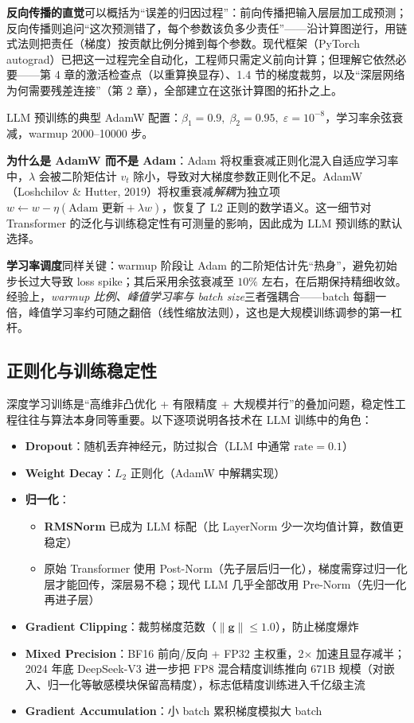 \documentclass[12pt,a4paper]{article}
\begin{document}
\textbf{反向传播的直觉}可以概括为“误差的归因过程”：前向传播把输入层层加工成预测；反向传播则追问“这次预测错了，每个参数该负多少责任”——沿计算图逆行，用链式法则把责任（梯度）按贡献比例分摊到每个参数。现代框架（PyTorch autograd）已把这一过程完全自动化，工程师只需定义前向计算；但理解它依然必要——第 4 章的激活检查点（以重算换显存）、1.4 节的梯度裁剪，以及“深层网络为何需要残差连接”（第 2 章），全部建立在这张计算图的拓扑之上。

LLM 预训练的典型 AdamW 配置：$\beta_1=0.9,\;\beta_2=0.95,\;\varepsilon=10^{-8}$，学习率余弦衰减，warmup 2000--10000 步。

\textbf{为什么是 AdamW 而不是 Adam}：Adam 将权重衰减正则化混入自适应学习率中，$\lambda$ 会被二阶矩估计 $v_t$ 除小，导致对大梯度参数正则化不足。AdamW（Loshchilov \& Hutter, 2019）将权重衰减\emph{解耦}为独立项 $w \leftarrow w - \eta(\text{Adam 更新} + \lambda w)$，恢复了 L2 正则的数学语义。这一细节对 Transformer 的泛化与训练稳定性有可测量的影响，因此成为 LLM 预训练的默认选择。

\textbf{学习率调度}同样关键：warmup 阶段让 Adam 的二阶矩估计先“热身”，避免初始步长过大导致 loss spike；其后采用余弦衰减至 $10\%$ 左右，在后期保持精细收敛。经验上，\emph{warmup 比例、峰值学习率与 batch size}三者强耦合——batch 每翻一倍，峰值学习率约可随之翻倍（线性缩放法则），这也是大规模训练调参的第一杠杆。
\subsection{正则化与训练稳定性}
深度学习训练是“高维非凸优化 + 有限精度 + 大规模并行”的叠加问题，稳定性工程往往与算法本身同等重要。以下逐项说明各技术在 LLM 训练中的角色：
\begin{itemize}
  \item \textbf{Dropout}：随机丢弃神经元，防过拟合（LLM 中通常 $\text{rate}=0.1$）
  \item \textbf{Weight Decay}：$L_2$ 正则化（AdamW 中解耦实现）
  \item \textbf{归一化}：
  \begin{itemize}
    \item \textbf{RMSNorm} 已成为 LLM 标配（比 LayerNorm 少一次均值计算，数值更稳定）
    \item 原始 Transformer 使用 Post-Norm（先子层后归一化），梯度需穿过归一化层才能回传，深层易不稳；现代 LLM 几乎全部改用 Pre-Norm（先归一化再进子层）
  \end{itemize}
  \item \textbf{Gradient Clipping}：裁剪梯度范数（$\|\mathbf{g}\| \leq 1.0$），防止梯度爆炸
  \item \textbf{Mixed Precision}：BF16 前向/反向 + FP32 主权重，2$\times$ 加速且显存减半；2024 年底 DeepSeek-V3 进一步把 FP8 混合精度训练推向 671B 规模（对嵌入、归一化等敏感模块保留高精度），标志低精度训练进入千亿级主流
  \item \textbf{Gradient Accumulation}：小 batch 累积梯度模拟大 batch
\end{itemize}
\end{document}
